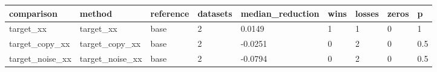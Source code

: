 \begin{tabular}{lllllllll}
\toprule
comparison & method & reference & datasets & median\_reduction & wins & losses & zeros & p \\
\midrule
target\_xx & target\_xx & base & 2 & 0.0149 & 1 & 1 & 0 & 1 \\
target\_copy\_xx & target\_copy\_xx & base & 2 & -0.0251 & 0 & 2 & 0 & 0.5 \\
target\_noise\_xx & target\_noise\_xx & base & 2 & -0.0794 & 0 & 2 & 0 & 0.5 \\
\bottomrule
\end{tabular}
